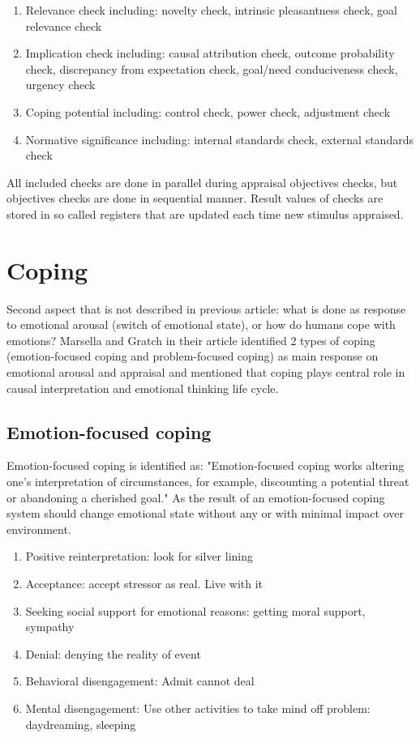 \begin{enumerate}
 \item  Relevance check including: novelty check, intrinsic pleasantness check, goal relevance check
 \item  Implication check including: causal attribution check, outcome probability check, discrepancy from expectation check, goal/need conduciveness check, urgency check
 \item  Coping potential including: control check, power check, adjustment check
 \item  Normative significance including: internal standards check, external standards check
\end{enumerate}

All included checks are done in parallel during appraisal objectives checks, but objectives checks are done in sequential manner.
Result values of checks are stored in so called registers that are updated each time new stimulus appraised.

\section{Coping}

Second aspect that is not described in previous article: what is done as response to emotional arousal (switch of emotional state), or how do humans cope with emotions?
Marsella and Gratch in their article \cite{dont_worry_be_happy} identified 2 types of coping (emotion-focused coping and problem-focused coping) as main response on emotional arousal and appraisal and mentioned that coping plays central role in causal interpretation and emotional thinking life cycle.

\subsection{Emotion-focused coping}

Emotion-focused coping is identified as: "Emotion-focused coping works altering one’s interpretation of circumstances, for example, discounting a potential threat or abandoning a cherished goal." As the result of an emotion-focused coping system should change emotional state without any or with minimal impact over environment.

\begin{enumerate}
 \item  Positive reinterpretation: look for silver lining
 \item  Acceptance: accept stressor as real. Live with it
 \item  Seeking  social  support  for  emotional  reasons: getting moral support, sympathy
 \item  Denial: denying the reality of event
 \item  Behavioral disengagement: Admit cannot deal
 \item  Mental  disengagement:  Use  other  activities  to take mind off problem: daydreaming, sleeping
\end{enumerate}

